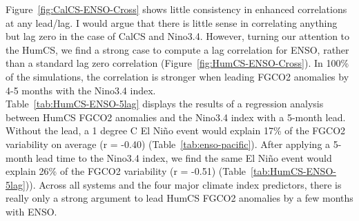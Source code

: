 \documentclass[12pt]{article}
\begin{document}
Figure~\ref{fig:CalCS-ENSO-Cross} shows little consistency in enhanced correlations at any lead/lag. I would argue that there is little sense in correlating anything but lag zero in the case of CalCS and Nino3.4. However, turning our attention to the HumCS, we find a strong case to compute a lag correlation for ENSO, rather than a standard lag zero correlation (Figure~\ref{fig:HumCS-ENSO-Cross}). In 100\% of the simulations, the correlation is stronger when leading FGCO2 anomalies by 4-5 months with the Nino3.4 index. \\

Table~\ref{tab:HumCS-ENSO-5lag} displays the results of a regression analysis between HumCS FGCO2 anomalies and the Nino3.4 index with a 5-month lead. Without the lead, a 1 degree C El Ni\~no event would explain 17\% of the FGCO2 variability on average (r = -0.40) (Table~\ref{tab:enso-pacific}). After applying a 5-month lead time to the Nino3.4 index, we find the same El Ni\~no event would explain 26\% of the FGCO2 variability (r = -0.51) (Table~\ref{tab:HumCS-ENSO-5lag})). Across all systems and the four major climate index predictors, there is really only a strong argument to lead HumCS FGCO2 anomalies by a few months with ENSO. 
\end{document}

